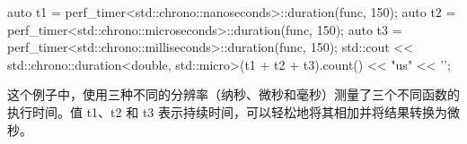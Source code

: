\begin{cpp}
auto t1 = perf_timer<std::chrono::nanoseconds>::duration(func, 150);
auto t2 = perf_timer<std::chrono::microseconds>::duration(func, 150);
auto t3 = perf_timer<std::chrono::milliseconds>::duration(func, 150);
std::cout
    << std::chrono::duration<double, std::micro>(t1 + t2 + t3).count()
    << "us" << '\n';
\end{cpp}

这个例子中，使用三种不同的分辨率（纳秒、微秒和毫秒）测量了三个不同函数的执行时间。值 t1、t2 和 t3 表示持续时间，可以轻松地将其相加并将结果转换为微秒。




